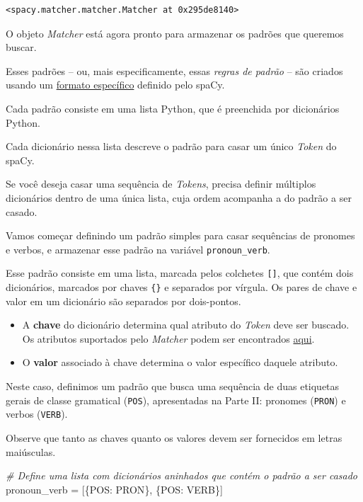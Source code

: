 \documentclass[
  brazilian,
]{article}
\newenvironment{Shaded}{}{}
\newcommand{\CommentTok}[1]{\textcolor[rgb]{0.38,0.63,0.69}{\textit{#1}}}
\newcommand{\NormalTok}[1]{#1}
\newcommand{\OperatorTok}[1]{\textcolor[rgb]{0.40,0.40,0.40}{#1}}
\newcommand{\StringTok}[1]{\textcolor[rgb]{0.25,0.44,0.63}{#1}}
\providecommand{\tightlist}{%
  \setlength{\itemsep}{0pt}\setlength{\parskip}{0pt}}
\begin{document}
\begin{verbatim}
<spacy.matcher.matcher.Matcher at 0x295de8140>
\end{verbatim}

O objeto \emph{Matcher} está agora pronto para armazenar os padrões que
queremos buscar.

Esses padrões -- ou, mais especificamente, essas \emph{regras de padrão}
-- são criados usando um
\href{https://spacy.io/api/matcher\#patterns}{formato específico}
definido pelo spaCy.

Cada padrão consiste em uma lista Python, que é preenchida por
dicionários Python.

Cada dicionário nessa lista descreve o padrão para casar um único
\emph{Token} do spaCy.

Se você deseja casar uma sequência de \emph{Tokens}, precisa definir
múltiplos dicionários dentro de uma única lista, cuja ordem acompanha a
do padrão a ser casado.

Vamos começar definindo um padrão simples para casar sequências de
pronomes e verbos, e armazenar esse padrão na variável
\texttt{pronoun\_verb}.

Esse padrão consiste em uma lista, marcada pelos colchetes
\texttt{{[}{]}}, que contém dois dicionários, marcados por chaves
\texttt{\{\}} e separados por vírgula. Os pares de chave e valor em um
dicionário são separados por dois-pontos.

\begin{itemize}
\tightlist
\item
  A \textbf{chave} do dicionário determina qual atributo do \emph{Token}
  deve ser buscado. Os atributos suportados pelo \emph{Matcher} podem
  ser encontrados \href{https://spacy.io/api/matcher\#patterns}{aqui}.
\item
  O \textbf{valor} associado à chave determina o valor específico
  daquele atributo.
\end{itemize}

Neste caso, definimos um padrão que busca uma sequência de duas
etiquetas gerais de classe gramatical (\texttt{POS}), apresentadas na
Parte II: pronomes (\texttt{PRON}) e verbos (\texttt{VERB}).

Observe que tanto as chaves quanto os valores devem ser fornecidos em
letras maiúsculas.

\begin{Shaded}
\begin{Highlighting}[]
\CommentTok{\# Define uma lista com dicionários aninhados que contém o padrão a ser casado}
\NormalTok{pronoun\_verb }\OperatorTok{=}\NormalTok{ [\{}\StringTok{\textquotesingle{}POS\textquotesingle{}}\NormalTok{: }\StringTok{\textquotesingle{}PRON\textquotesingle{}}\NormalTok{\}, \{}\StringTok{\textquotesingle{}POS\textquotesingle{}}\NormalTok{: }\StringTok{\textquotesingle{}VERB\textquotesingle{}}\NormalTok{\}]}
\end{Highlighting}
\end{Shaded}
\end{document}

